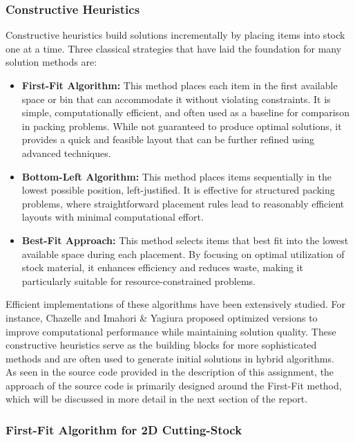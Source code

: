 \documentclass[a4paper]{article}
\begin{document}
    \subsubsection{Constructive Heuristics}
    Constructive heuristics build solutions incrementally by placing items into stock one at a time. Three classical strategies that have laid the foundation for many solution methods are:  
    \begin{itemize}
        \item \textbf{First-Fit Algorithm:} This method places each item in the first available space or bin that can accommodate it without violating constraints. It is simple, computationally efficient, and often used as a baseline for comparison in packing problems. While not guaranteed to produce optimal solutions, it provides a quick and feasible layout that can be further refined using advanced techniques.  
        \item \textbf{Bottom-Left Algorithm:} This method places items sequentially in the lowest possible position, left-justified. It is effective for structured packing problems, where straightforward placement rules lead to reasonably efficient layouts with minimal computational effort.  
        \item \textbf{Best-Fit Approach:} This method selects items that best fit into the lowest available space during each placement. By focusing on optimal utilization of stock material, it enhances efficiency and reduces waste, making it particularly suitable for resource-constrained problems.  
    \end{itemize}  
    Efficient implementations of these algorithms have been extensively studied. For instance, Chazelle \cite{Chazelle} and Imahori \& Yagiura \cite{imahori_yagiura2001} proposed optimized versions to improve computational performance while maintaining solution quality. These constructive heuristics serve as the building blocks for more sophisticated methods and are often used to generate initial solutions in hybrid algorithms.
    \vspace{0.2cm}\\
    As seen in the source code provided in the description of this assignment, the approach of the source code is primarily designed around the First-Fit method, which will be discussed in more detail in the next section of the report.
    
    \subsubsection{First-Fit Algorithm for 2D Cutting-Stock}
\end{document}
